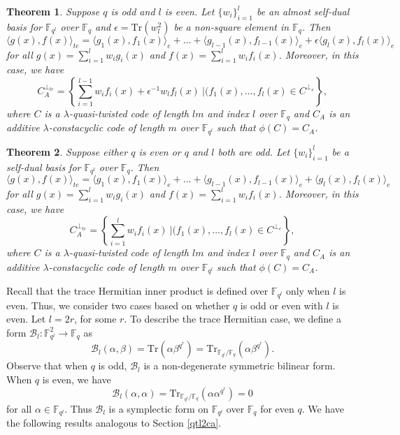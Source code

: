 \documentclass[12 pt]{extarticle}
\numberwithin{equation}{section}
\newtheorem{theorem}{Theorem}[section]
\theoremstyle{definition}
\begin{document}
\begin{theorem}
    Suppose $q$ is odd and $l$ is even. Let $\{w_i\}_{i=1}^l$ be an almost self-dual basis for $\mathbb{F}_{q^l}$ over $\mathbb{F}_q$ and $\epsilon=\text{Tr}(w_l^2)$ be a non-square element in $\mathbb{F}_q$. Then
 $$\langle g(x),f(x)\rangle_{te}=\langle g_1(x),f_1(x)\rangle_e+\dots+\langle g_{l-1}(x),f_{l-1}(x)\rangle_e+\epsilon \langle g_l(x),f_l(x)\rangle_e$$
 for all  $g(x)=\sum_{i=1}^lw_ig_i(x)$ and $f(x)=\sum_{i=1}^lw_if_i(x)$. Moreover, in this case, we have  $$C_A^{\perp_{te}}=\left \{\sum_{i=1}^{l-1}w_if_i(x)+\epsilon^{-1}w_lf_l(x)\ | (f_1(x),\dots,f_l(x)\in C^{\perp_e}\right \},$$
where $C$ is a $\lambda$-quasi-twisted code of length $lm$ and index $l$ over $\mathbb{F}_q$ and $C_A$ is an additive $\lambda$-constacyclic code of length $m$ over $\mathbb{F}_{q^l}$ such that  $\phi(C)=C_A$.
\end{theorem}

\begin{theorem}
     Suppose either $q$ is even or $q$ and  $l$ both are odd. Let $\{w_i\}_{i=1}^l$ be a self-dual basis for $\mathbb{F}_{q^l}$ over $\mathbb{F}_q$. Then
 $$\langle g(x),f(x)\rangle_{te}=\langle g_1(x),f_1(x)\rangle_e+\dots+\langle g_{l-1}(x),f_{l-1}(x)\rangle_e+ \langle g_l(x),f_l(x)\rangle_e$$
 for all $g(x)=\sum_{i=1}^lw_ig_i(x)$ and $f(x)=\sum_{i=1}^lw_if_i(x)$. Moreover, in this case, we have  $$C_A^{\perp_{te}}=\left \{\sum_{i=1}^{l}w_if_i(x)\ | (f_1(x),\dots,f_l(x)\in C^{\perp_e}\right \},$$
where $C$ is a $\lambda$-quasi-twisted code of length $lm$ and index $l$ over $\mathbb{F}_q$ and $C_A$ is an additive $\lambda$-constacyclic code of length $m$ over $\mathbb{F}_{q^l}$ such that  $\phi(C)=C_A$.
\end{theorem} 
Recall that the trace Hermitian inner product  is defined over $\mathbb{F}_{q^l}$ only when $l$ is even. Thus, we consider two cases based on whether $q$ is odd or even with $l$ is even. Let $l=2r$, for some $r$. To describe the trace Hermitian case, we define a form $\mathcal{B}_l:\mathbb{F}_{q^l}^2\to \mathbb{F}_q$ as
$$\mathcal{B}_l(\alpha,\beta)=\text{Tr}(\alpha\beta^{q^r})=\text{Tr}_{\mathbb{F}_{q^l}/\mathbb{F}_q}(\alpha\beta^{q^r}).$$
Observe that when $q$ is odd, $\mathcal{B}_l$ is a non-degenerate symmetric bilinear form.  When $q$ is even, we have 
$$\mathcal{B}_l(\alpha,\alpha)=\text{Tr}_{\mathbb{F}_{q^l}/\mathbb{F}_q}(\alpha\alpha^{q^r})=0$$
for all $\alpha\in \mathbb{F}_{q^l}$. Thus  $\mathcal{B}_l$ is a symplectic form on $\mathbb{F}_{q^l}$ over $\mathbb{F}_q$ for even $q$. We have the following results analogous to Section \ref{qtl2ca}.
\end{document}
